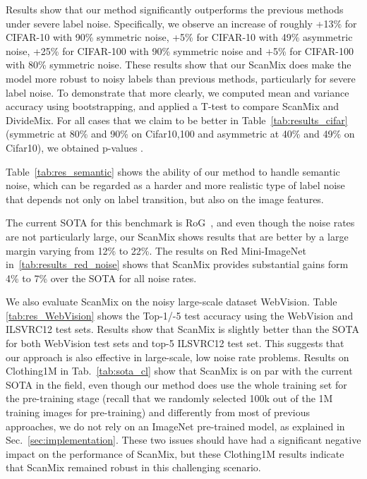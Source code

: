 \documentclass[review]{elsarticle}
\theoremstyle{plain}
\begin{document}
Results show that our method significantly outperforms the previous methods under severe label noise. Specifically, we observe an increase of roughly +13\% for CIFAR-10 with 90\% symmetric noise, +5\% for CIFAR-10 with 49\% asymmetric noise, +25\% for CIFAR-100 with 90\% symmetric noise and +5\% for CIFAR-100 with 80\% symmetric noise. These results show that our ScanMix does make the model more robust to noisy labels than previous methods, particularly for severe label noise. To demonstrate that more clearly, we computed mean and variance accuracy using bootstrapping, and applied a T-test to compare ScanMix and DivideMix. For all cases that we claim to be better in Table~\ref{tab:results_cifar} (symmetric at 80\% and 90\% on Cifar10,100 and asymmetric at 40\% and 49\% on Cifar10), we obtained p-values . 

Table~\ref{tab:res_semantic} shows the ability of our method to handle semantic noise, which can be regarded as a harder and more realistic type of label noise that depends not only on label transition, but also on the image features.  

The current SOTA for this benchmark is RoG~\citep{rog}, and even though the noise rates are not particularly large, our ScanMix shows results that are better by a large margin varying from 12\% to 22\%.
The results on Red Mini-ImageNet~\citep{FaMUS} in~\autoref{tab:results_red_noise} shows that ScanMix provides substantial gains form 4\% to 7\% over the SOTA for all noise rates. 

We also evaluate ScanMix on the noisy large-scale dataset WebVision. Table \ref{tab:res_WebVision} shows the Top-1/-5 test accuracy using the WebVision and ILSVRC12 test sets. Results show that ScanMix is slightly better than the SOTA for both WebVision test sets and top-5 ILSVRC12 test set. This suggests that our approach is also effective in large-scale, low noise rate problems.
Results on Clothing1M in Tab.~\ref{tab:sota_cl} show that ScanMix is on par with the current SOTA in the field, even though our method does use the whole training set for the pre-training stage (recall that we randomly selected 100k out of the 1M training images for pre-training) and differently from most of previous approaches, we do not rely on an ImageNet pre-trained model, as explained in Sec.~\ref{sec:implementation}. These two issues should have had a significant negative impact on the performance of ScanMix, but these Clothing1M results indicate that ScanMix remained robust in this challenging scenario. 
\end{document}
